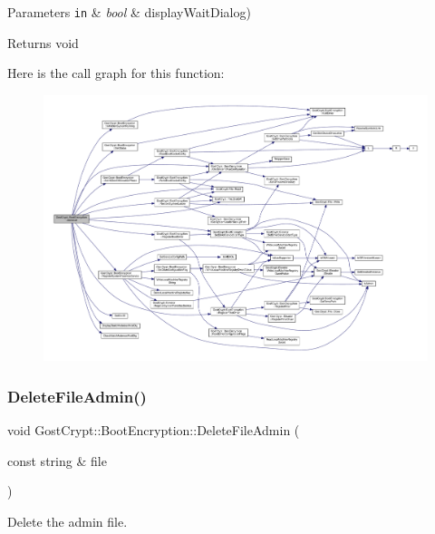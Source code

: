 \begin{DoxyParams}[1]{Parameters}
\mbox{\tt in}  & {\em bool} & display\+Wait\+Dialog) \\
\hline
\end{DoxyParams}
\begin{DoxyReturn}{Returns}
void 
\end{DoxyReturn}
Here is the call graph for this function\+:
\nopagebreak
\begin{figure}[H]
\begin{center}
\leavevmode
\includegraphics[width=350pt]{class_gost_crypt_1_1_boot_encryption_a9ac6f366c5a3c03ac5891ba22afe769d_cgraph}
\end{center}
\end{figure}
\mbox{\label{class_gost_crypt_1_1_boot_encryption_a879bd63fb7a3dd4e66c12787b5808c40}} 
\subsubsection{\texorpdfstring{Delete\+File\+Admin()}{DeleteFileAdmin()}}
{\footnotesize\ttfamily void Gost\+Crypt\+::\+Boot\+Encryption\+::\+Delete\+File\+Admin (\begin{DoxyParamCaption}\item[{const string \&}]{file }\end{DoxyParamCaption})}



Delete the admin file. 


